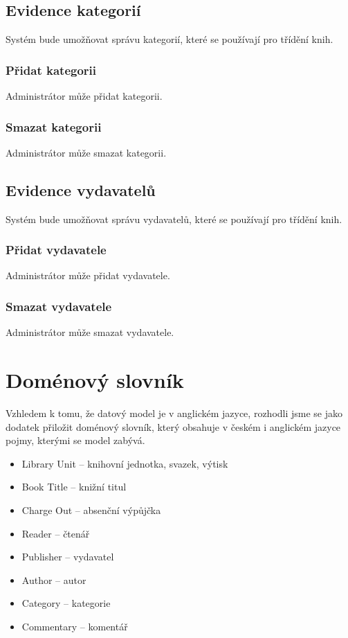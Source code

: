 \documentclass{article}
\begin{document}
\subsection{Evidence kategorií}
Systém bude umožňovat správu kategorií, které se používají pro třídění knih.

\subsubsection{Přidat kategorii}
Administrátor může přidat kategorii.

\subsubsection{Smazat kategorii}
Administrátor může smazat kategorii.

\subsection{Evidence vydavatelů}
Systém bude umožňovat správu vydavatelů, které se používají pro třídění knih.

\subsubsection{Přidat vydavatele}
Administrátor může přidat vydavatele.

\subsubsection{Smazat vydavatele}
Administrátor může smazat vydavatele.

\newpage

\appendix
\section{Doménový slovník}

Vzhledem k tomu, že datový model je v anglickém jazyce, rozhodli jsme se jako
dodatek přiložit doménový slovník, který obsahuje v českém i anglickém jazyce
pojmy, kterými se model zabývá.

\begin{itemize}

\item Library Unit -- knihovní jednotka, svazek, výtisk

\item Book Title -- knižní titul

\item Charge Out -- absenční výpůjčka

\item Reader -- čtenář

\item Publisher -- vydavatel

\item Author -- autor

\item Category -- kategorie

\item Commentary -- komentář


\end{itemize}
\end{document}
